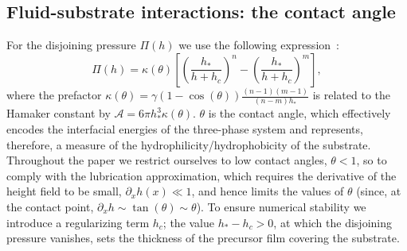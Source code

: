 \subsection{Fluid-substrate interactions: the contact angle}\label{subsec:fluid_substrate}
For the disjoining pressure $\Pi(h)$ we use the following expression~\cite{crasterDynamicsStabilityThin2009, peschkaSignaturesSlipDewetting2019, nesicFullyNonlinearDynamics2015, oronLongscaleEvolutionThin1997}:
\begin{equation}\label{eq:disjoin_p}
    \Pi(h) = \kappa(\theta) \left[\left(\frac{h_{\ast}}{h+h_c}\right)^n - \left(\frac{h_{\ast}}{h+h_c}\right)^m\right],
\end{equation}
where the prefactor $\kappa(\theta) = \gamma(1-\cos(\theta))\frac{(n-1)(m-1)}{(n-m)h_{\ast}}$ is related to the Hamaker constant by $\mathcal{A} = 6 \pi h_{\ast}^3 \kappa(\theta)$.
$\theta$ is the contact angle, which effectively encodes the interfacial energies of the three-phase system and represents, therefore, a measure of the hydrophilicity/hydrophobicity of the substrate.
Throughout the paper we restrict ourselves to low contact angles, $\theta < 1$, so to comply with the lubrication approximation, which requires the derivative of the height field to be small, $\partial_x h(x) \ll 1$, and hence limits the values of $\theta$ (since, at the contact point, $\partial_x h \sim \tan(\theta) \sim \theta$).
To ensure numerical stability we introduce a regularizing term $h_c$; the value $h_{\ast} - h_c > 0$, at which the disjoining pressure vanishes, sets the thickness of the precursor film covering the substrate.

